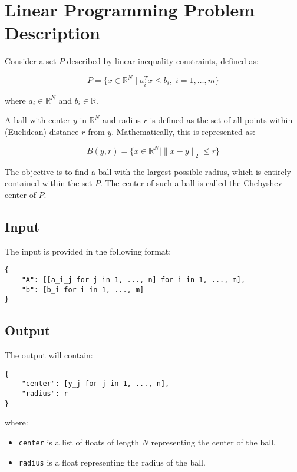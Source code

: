 \documentclass{article}
\begin{document}
\section*{Linear Programming Problem Description}

Consider a set \( P \) described by linear inequality constraints, defined as:

\[
P = \{ x \in \mathbb{R}^N \mid a_i^T x \leq b_i , \; i = 1, \ldots, m \}
\]

where \( a_i \in \mathbb{R}^N \) and \( b_i \in \mathbb{R} \).

A ball with center \( y \) in \( \mathbb{R}^N \) and radius \( r \) is defined as the set of all points within (Euclidean) distance \( r \) from \( y \). Mathematically, this is represented as:

\[
B(y, r) = \{ x \in \mathbb{R}^N \mid \| x - y \|_2 \leq r \}
\]

The objective is to find a ball with the largest possible radius, which is entirely contained within the set \( P \). The center of such a ball is called the Chebyshev center of \( P \).

\subsection*{Input}

The input is provided in the following format:

\begin{verbatim}
{
    "A": [[a_i_j for j in 1, ..., n] for i in 1, ..., m],
    "b": [b_i for i in 1, ..., m]
}
\end{verbatim}

\subsection*{Output}

The output will contain:

\begin{verbatim}
{
    "center": [y_j for j in 1, ..., n],
    "radius": r
}
\end{verbatim}

where:
\begin{itemize}
    \item \texttt{center} is a list of floats of length \( N \) representing the center of the ball.
    \item \texttt{radius} is a float representing the radius of the ball.
\end{itemize}
\end{document}
